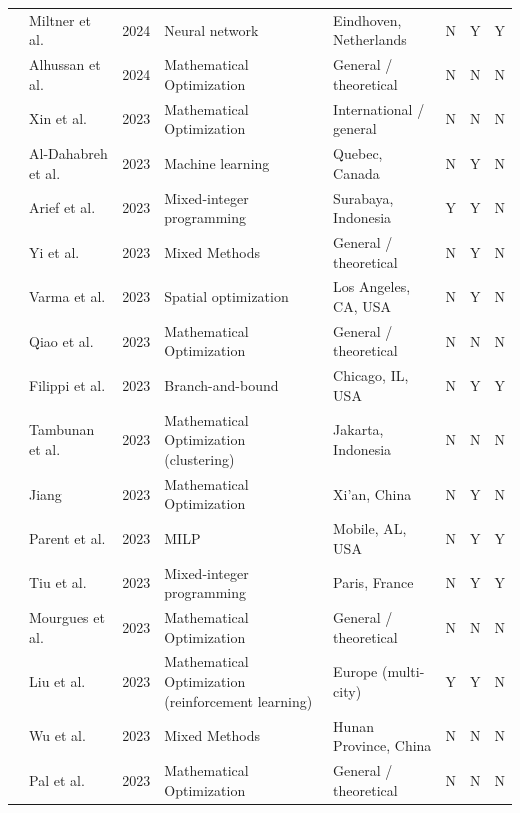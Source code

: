 \documentclass[letterpaper, 12pt, oneside, doublespacing]{Thesis}
\begin{document}
\begin{longtable}{L{0.9cm} L{1.8cm} L{0.7cm} L{2.5cm} L{2.1cm} L{0.7cm} L{0.7cm} L{0.7cm}}
\cite{towards_using_2024} & Miltner et al. & 2024 & Neural network & Eindhoven, Netherlands & N & Y & Y \\
\cite{urban_electric_2024} & Alhussan et al. & 2024 & Mathematical Optimization & General {\slash} theoretical & N & N & N \\
\cite{a_battery_2023} & Xin et al. & 2023 & Mathematical Optimization & International {\slash} general & N & N & N \\
\cite{a_data-driven_2023} & Al-Dahabreh et al. & 2023 & Machine learning & Quebec, Canada & N & Y & N \\
\cite{a_robust_2023} & Arief et al. & 2023 & Mixed-integer programming & Surabaya, Indonesia & Y & Y & N \\
\cite{an_agent-based_2023} & Yi et al. & 2023 & Mixed Methods & General {\slash} theoretical & N & Y & N \\
\cite{electric_vehicle_2023} & Varma et al. & 2023 & Spatial optimization & Los Angeles, CA, USA & N & Y & N \\
\cite{fast-charging_station_2023} & Qiao et al. & 2023 & Mathematical Optimization & General {\slash} theoretical & N & N & N \\
\cite{incorporating_time-dependent_2023} & Filippi et al. & 2023 & Branch-and-bound & Chicago, IL, USA & N & Y & Y \\
\cite{initial_location_2023} & Tambunan et al. & 2023 & Mathematical Optimization (clustering) & Jakarta, Indonesia & N & N & N \\
\cite{layout_and_2023} & Jiang & 2023 & Mathematical Optimization & Xi'an, China & N & Y & N \\
\cite{maximum_flow-based_2023} & Parent et al. & 2023 & MILP & Mobile, AL, USA & N & Y & Y \\
\cite{on_the_2023} & Tiu et al. & 2023 & Mixed-integer programming & Paris, France & N & Y & Y \\
\cite{optimal_location_2023} & Mourgues et al. & 2023 & Mathematical Optimization & General {\slash} theoretical & N & N & N \\
\cite{optimal_placement_2023} & Liu et al. & 2023 & Mathematical Optimization (reinforcement learning) & Europe (multi-city) & Y & Y & N \\
\cite{optimizing_electric_2023} & Wu et al. & 2023 & Mixed Methods & Hunan Province, China & N & N & N \\
\cite{placement_of_2023} & Pal et al. & 2023 & Mathematical Optimization & General {\slash} theoretical & N & N & N \\

\end{longtable}
\end{document}
